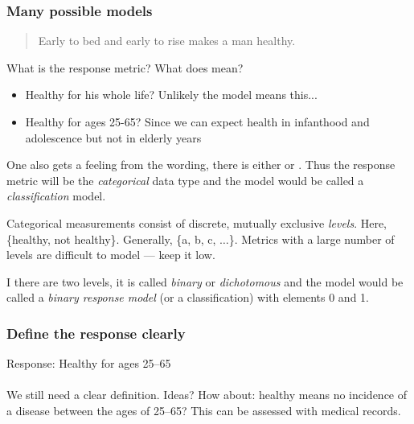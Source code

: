 \documentclass[handout]{beamer}
\begin{document}
\begin{frame}\frametitle{Many possible models}

\small
\begin{quotation}
Early to bed and early to rise makes a man healthy.
\end{quotation}

What is the response metric? \pause What does  mean?\\

\begin{itemize}
\item Healthy for his whole life? Unlikely the model means this...
\item Healthy for ages 25-65? Since we can expect health in infanthood and adolescence but not in elderly years
\end{itemize}

One also gets a feeling from the wording, there is either  or . Thus the response metric will be the \textit{categorical} data type and the model would be called a \textit{classification} model. \\\vspace{0.2cm}

Categorical measurements consist of discrete, mutually exclusive \textit{levels}. Here, \{healthy, not healthy\}. Generally, \{a, b, c, $\ldots$\}. Metrics with a large number of levels are difficult to model --- keep it low.\\\vspace{0.2cm}

I there are two levels, it is called \textit{binary} or \textit{dichotomous} and the model would be called a \textit{binary response model} (or a classification) with elements 0 and 1.
	
\end{frame}

\begin{frame}\frametitle{Define the response clearly}

Response: Healthy for ages 25--65 \\~\\

We still need a clear definition. Ideas? How about: healthy means no incidence of a  disease between the ages of 25--65? This can be assessed with medical records. 
	
\end{frame}
\end{document}
